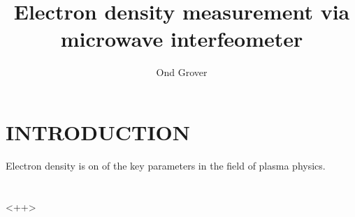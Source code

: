 \documentclass[twoside]{articlek}
\title{Electron density measurement via microwave interfeometer}
\author{Ond Grover}
\begin{document}
\maketitle{}
\section{INTRODUCTION}
Electron density is on of the  key parameters in the field of plasma physics. 

\section{}<++>
\end{document}
